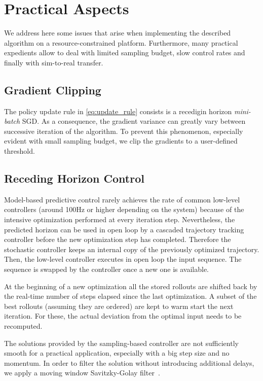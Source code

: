 \section{Practical Aspects}

We address here some issues that arise when implementing the described algorithm on a resource-constrained platform. Furthermore, many practical expedients allow to deal with limited sampling budget, slow control rates and finally with sim-to-real transfer.  

\subsection{Gradient Clipping} 
The policy update rule in \eqn \ref{eq:update_rule} consists is a recedigin horizon \emph{mini-batch} SGD. As a consequence, the gradient variance can greatly vary between successive iteration of the algorithm. To prevent this phenomenon, especially evident with small sampling budget, we clip the gradients to a user-defined threshold.  

\subsection{Receding Horizon Control} 
Model-based predictive control rarely achieves the rate of common low-level controllers (around 100Hz or higher depending on the system) because of the intensive optimization performed at every iteration step. Nevertheless, the predicted horizon can be used in open loop by a cascaded trajectory tracking controller before the new optimization step has completed. Therefore the stochastic controller keeps an internal copy of the previously optimized trajectory. Then, the low-level controller executes in open loop the input sequence. The sequence is swapped by the controller once a new one is available.

At the beginning of a new optimization all the stored rollouts are shifted back by the real-time number of steps elapsed since the last optimization. A subset of the best rollouts (assuming they are ordered) are kept to warm start the next iteration. For these, the actual deviation from the optimal input needs to be recomputed.

The solutions provided by the sampling-based controller are not sufficiently smooth for a practical application, especially with a big step size and no momentum. 
In order to filter the solution without introducing additional delays, we apply a moving window Savitzky-Golay filter~\cite{gorry1990general}. 

